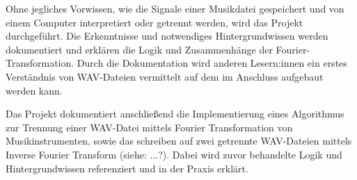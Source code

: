 Ohne jegliches Vorwissen, wie die Signale einer Musikdatei gespeichert und von einem Computer interpretiert oder getrennt werden, wird das Projekt durchgeführt. Die Erkenntnisse und notwendiges Hintergrundwissen werden dokumentiert und erklären die Logik und Zusammenhänge der Fourier-Transformation. Durch die Dokumentation wird anderen Lesern:innen ein erstes Verständnis von WAV-Dateien vermittelt auf dem im Anschluss aufgebaut werden kann.

\par

Das Projekt dokumentiert anschließend die Implementierung eines Algorithmus zur Trennung einer WAV-Datei mittels Fourier Transformation von Musikinstrumenten, sowie das schreiben auf zwei getrennte WAV-Dateien mittels Inverse Fourier Transform (siehe: ...?). Dabei wird zuvor behandelte Logik und Hintergrundwissen referenziert und in der Praxis erklärt.